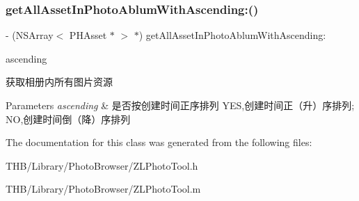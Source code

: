 \subsubsection{\texorpdfstring{get\+All\+Asset\+In\+Photo\+Ablum\+With\+Ascending\+:()}{getAllAssetInPhotoAblumWithAscending:()}}
{\footnotesize\ttfamily -\/ (N\+S\+Array$<$ P\+H\+Asset $\ast$ $>$ $\ast$) get\+All\+Asset\+In\+Photo\+Ablum\+With\+Ascending\+: \begin{DoxyParamCaption}\item[{(B\+O\+OL)}]{ascending }\end{DoxyParamCaption}}



获取相册内所有图片资源 


\begin{DoxyParams}{Parameters}
{\em ascending} & 是否按创建时间正序排列 Y\+ES,创建时间正（升）序排列; NO,创建时间倒（降）序排列 \\
\hline
\end{DoxyParams}


The documentation for this class was generated from the following files\+:\begin{DoxyCompactItemize}
\item 
T\+H\+B/\+Library/\+Photo\+Browser/Z\+L\+Photo\+Tool.\+h\item 
T\+H\+B/\+Library/\+Photo\+Browser/Z\+L\+Photo\+Tool.\+m\end{DoxyCompactItemize}
